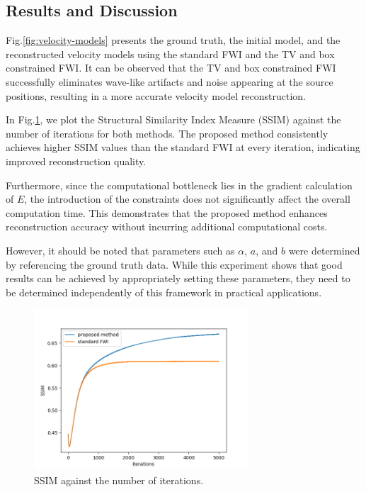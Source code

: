 \subsection{Results and Discussion}\label{subsec:results-and-discussion}

Fig.\ref{fig:velocity-models} presents the ground truth, the initial model, and the reconstructed velocity models using the standard FWI and the TV and box constrained FWI.
It can be observed that the TV and box constrained FWI successfully eliminates wave-like artifacts and noise appearing at the source positions, resulting in a more accurate velocity model reconstruction.

In Fig.\ref{fig:ssim}, we plot the Structural Similarity Index Measure (SSIM) against the number of iterations for both methods.
The proposed method consistently achieves higher SSIM values than the standard FWI at every iteration, indicating improved reconstruction quality.

Furthermore, since the computational bottleneck lies in the gradient calculation of $E$, the introduction of the constraints does not significantly affect the overall computation time.
This demonstrates that the proposed method enhances reconstruction accuracy without incurring additional computational costs.

However, it should be noted that parameters such as $\alpha$, $a$, and $b$ were determined by referencing the ground truth data.
While this experiment shows that good results can be achieved by appropriately setting these parameters, they need to be determined independently of this framework in practical applications.


\begin{figure}[htbp]
\vspace{-\baselineskip}
\begin{center}
    \includegraphics[width=80mm]{public/ssim}
    \caption{SSIM against the number of iterations.}
    \label{fig:ssim}
\end{center}
\vspace{-\baselineskip}
\end{figure}



